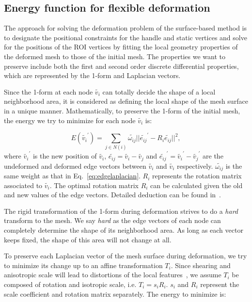 \subsection{Energy function for flexible deformation} The approach
for solving  the deformation problem of the surface-based method is
to designate the positional constraints for the handle and static
vertices and solve for the positions of the ROI vertices by fitting
the local geometry properties of the deformed mesh to those of the
initial mesh. The properties we want to preserve include both the
first and second order discrete differential properties, which are
represented by the 1-form and Laplacian vectors.

Since the 1-form at each node $\tilde{v_i}$ can  totally decide the
shape of a local neighborhood area, it is considered as defining the
local shape of the mesh surface in a unique manner. Mathematically,
to preserve the 1-form of the initial mesh, the energy we try to
minimize for each node $\tilde{v_i}$ is:

\begin{equation}
\label{eq:edgerigidenergy}
E(\tilde{v_i}^\prime)=\sum\limits_{j\in N(i)}{\tilde{\omega_{ij}} ||\tilde{e_{ij}}^\prime -R_i \tilde{e_{ij}}||^2},
\end{equation}
where $\tilde{v_i}^\prime$ is the new  position of $\tilde{v_i}$,
$\tilde{e_{ij}}=\tilde{v_i}-\tilde{v_j}$ and
$\tilde{e_{ij}}^\prime=\tilde{v_i}^\prime-\tilde{v_j}^\prime$ are
the undeformed and deformed edge vectors between $\tilde{v_i}$ and
$\tilde{v_i}$ respectively. $\tilde{\omega_{ij}}$ is the same weight
as that in Eq.~\ref{eq:edgelaplacian}. $R_i$ represents the rotation
matrix associated to $\tilde{v_i}$. The optimal rotation matrix
$R_i$ can be calculated given the old and new values of the edge
vectors. Detailed deduction can be found in~\cite{SA07}.

The rigid transformation of the 1-form during  deformation strives
to do a \textit{hard} transform to the mesh. We say \textit{hard} as
the edge vectors of each node can completely determine the shape of
its neighborhood area. As long as each vector keeps fixed, the shape
of this area will not change at all.

To preserve each Laplacian vector of the mesh  surface during
deformation, we try to minimize its change up to an affine
transformation $T_i$. Since shearing and anisotropic scale will lead
to distortions of the local features~\cite{FAT07}, we assume $T_i$
be composed of rotation and isotropic scale, i.e. $T_i=s_iR_i$.
$s_i$ and $R_i$ represent the scale coefficient and rotation matrix
separately. The energy to minimize is:

